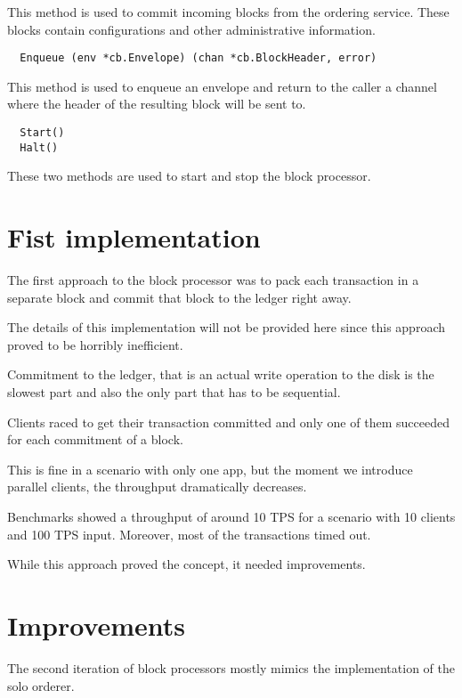 This method is used to commit incoming blocks from the ordering service. These blocks contain configurations and other administrative information.

\begin{lstlisting}
  Enqueue (env *cb.Envelope) (chan *cb.BlockHeader, error)
\end{lstlisting}

This method is used to enqueue an envelope and return to the caller a channel where the header of the resulting block will be sent to.

\begin{lstlisting}
  Start()
  Halt()
\end{lstlisting}

These two methods are used to start and stop the block processor.

\section{Fist implementation}

The first approach to the block processor was to pack each transaction in a separate block and commit that block to the ledger right away.

The details of this implementation will not be provided here since this approach proved to be horribly inefficient.

Commitment to the ledger, that is an actual write operation to the disk is the slowest part and also the only part that has to be sequential.

Clients raced to get their transaction committed and only one of them succeeded for each commitment of a block.

This is fine in a scenario with only one app, but the moment we introduce parallel clients, the throughput dramatically decreases.

Benchmarks showed a throughput of around 10 TPS for a scenario with 10 clients and 100 TPS input. Moreover, most of the transactions timed out.

While this approach proved the concept, it needed improvements.

\section{Improvements}
\label{sec:bp-impr}

The second iteration of block processors mostly mimics the implementation of the solo orderer.

